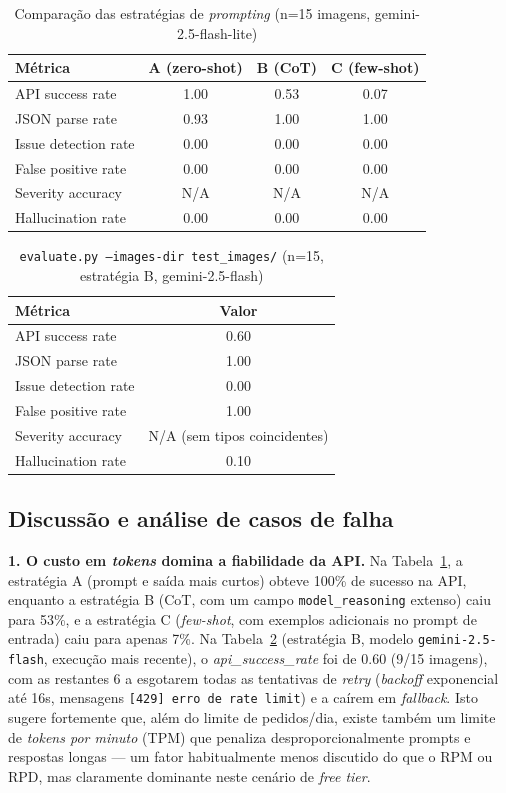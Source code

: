 \documentclass[conference]{IEEEtran}
\begin{document}
\begin{table}[h]
\centering
\caption{Comparação das estratégias de \textit{prompting} (n=15 imagens, gemini-2.5-flash-lite)}
\label{tab:strategies}
\begin{tabular}{lccc}
\toprule
Métrica & A (zero-shot) & B (CoT) & C (few-shot) \\
\midrule
API success rate & 1.00 & 0.53 & 0.07 \\
JSON parse rate & 0.93 & 1.00 & 1.00 \\
Issue detection rate & 0.00 & 0.00 & 0.00 \\
False positive rate & 0.00 & 0.00 & 0.00 \\
Severity accuracy & N/A & N/A & N/A \\
Hallucination rate & 0.00 & 0.00 & 0.00 \\
\bottomrule
\end{tabular}
\end{table}

\begin{table}[h]
\centering
\caption{\texttt{evaluate.py --images-dir test\_images/} (n=15, estratégia B, gemini-2.5-flash)}
\label{tab:imagesdir}
\begin{tabular}{lc}
\toprule
Métrica & Valor \\
\midrule
API success rate & 0.60 \\
JSON parse rate & 1.00 \\
Issue detection rate & 0.00 \\
False positive rate & 1.00 \\
Severity accuracy & N/A (sem tipos coincidentes) \\
Hallucination rate & 0.10 \\
\bottomrule
\end{tabular}
\end{table}

\subsection{Discussão e análise de casos de falha}

\textbf{1. O custo em \textit{tokens} domina a fiabilidade da API.} Na
Tabela~\ref{tab:strategies}, a estratégia A (prompt e saída mais curtos)
obteve 100\% de sucesso na API, enquanto a estratégia B (CoT, com um campo
\texttt{model\_reasoning} extenso) caiu para 53\%, e a estratégia C
(\textit{few-shot}, com exemplos adicionais no prompt de entrada) caiu para
apenas 7\%. Na Tabela~\ref{tab:imagesdir} (estratégia B, modelo
\texttt{gemini-2.5-flash}, execução mais recente), o \textit{api\_success\_rate}
foi de 0.60 (9/15 imagens), com as restantes 6 a esgotarem todas as
tentativas de \textit{retry} (\textit{backoff} exponencial até 16s,
mensagens \texttt{[429] erro de rate limit}) e a caírem em
\textit{fallback}. Isto sugere fortemente que, além do limite de
pedidos/dia, existe também um limite de \textit{tokens por minuto} (TPM) que
penaliza desproporcionalmente prompts e respostas longas --- um fator
habitualmente menos discutido do que o RPM ou RPD, mas claramente dominante
neste cenário de \textit{free tier}.
\end{document}
